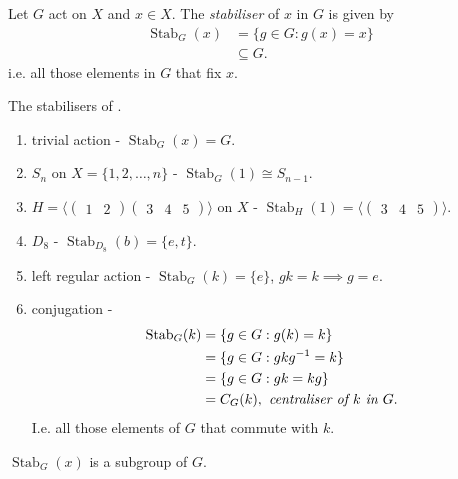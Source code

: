 \begin{definition}[Stabiliser] \label{def:19}
    Let $G$ act on $X$ and $x \in X$.
    The \emph{stabiliser} of $x$ in $G$ is given by
    \begin{align*}
        \operatorname{Stab}_G(x) &= \{ g \in G : g(x) = x \} \\
        &\subseteq G.
    \end{align*} 
    i.e. all those elements in $G$ that fix $x$.
\end{definition} 

\begin{example} \mbox{}
    The stabilisers of .
    \begin{enumerate}
        \item trivial action - $\operatorname{Stab}_G(x) = G$.
        \item $S_n$ on $X = \{1, 2, \ldots, n\}$ - $\operatorname{Stab}_G(1) \cong S_{n-1}$.
        \item $H = \langle \begin{pmatrix}1 & 2\end{pmatrix} \begin{pmatrix}3 & 4 & 5\end{pmatrix} \rangle$ on $X$ - $\operatorname{Stab}_H(1) = \langle \begin{pmatrix}3 & 4 & 5\end{pmatrix} \rangle$.
        \item $D_8$ - $\operatorname{Stab}_{D_8}(b) = \{e, t\}$. \\
        \item left regular action - $\operatorname{Stab}_G(k) = \{e\}$, $gk = k \implies g = e$.
        \item conjugation - \begin{align*}
            \operatorname{Stab}_G(k) &= \{g \in G : g(k) = k\} \\
            &= \{g \in G : g k g^{-1} = k\} \\
            &= \{g \in G : g k = kg \} \\
            &= C_G(k), \emph{ centraliser of $k$ in $G$}.
        \end{align*} I.e. all those elements of $G$ that commute with $k$.
    \end{enumerate} 
\end{example} 

\begin{lemma} \label{lem:18}
    $\operatorname{Stab}_G(x)$ is a subgroup of $G$.
\end{lemma} 

